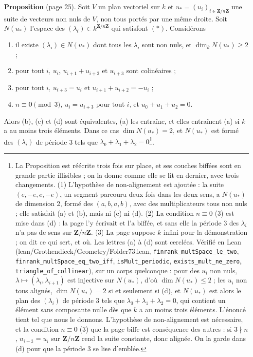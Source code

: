 \documentclass[11pt,a4paper]{article}
\begin{document}
\textbf{Proposition} (page 25). Soit $V$ un plan vectoriel sur $k$ et
$u_* = (u_i)_{i \in \mathbf{Z}/n\mathbf{Z}}$ une suite de vecteurs non nuls de
$V$, non tous portés par une même droite. Soit $N(u_*)$ l'espace des
$(\lambda_i) \in k^{\mathbf{Z}/n\mathbf{Z}}$ qui satisfont $(\ast)$. Considérons
\begin{enumerate}
  \item[(a)] il existe $(\lambda_i) \in N(u_*)$ dont tous les $\lambda_i$ sont
    non nuls, et $\dim_k N(u_*) \geqslant 2$ ;
  \item[(b)] pour tout $i$, $u_i$, $u_{i+1} + u_{i+2}$ et $u_{i+3}$ sont
    colinéaires ;
  \item[(c)] pour tout $i$, $u_{i+3} = u_i$ et $u_{i+1} + u_{i+2} = -u_i$ ;
  \item[(d)] $n \equiv 0 \pmod 3$, $u_i = u_{i+3}$ pour tout $i$, et
    $u_0 + u_1 + u_2 = 0$.
\end{enumerate}
Alors (b), (c) et (d) sont équivalentes, (a) les entraîne, et elles entraînent
(a) si $k$ a au moins trois éléments. Dans ce cas $\dim N(u_*) = 2$, et
$N(u_*)$ est formé des $(\lambda_i)$ de période 3 tels que
$\lambda_0 + \lambda_1 + \lambda_2 = 0$\footnote{La Proposition est réécrite
trois fois sur place, et ses couches biffées sont en grande partie illisibles ;
on la donne comme elle se lit en dernier, avec trois changements. (1)
L'hypothèse de non-alignement est ajoutée : la suite $(e, -e, e, -e)$, un
segment parcouru deux fois dans les deux sens, a $N(u_*)$ de dimension 2,
formé des $(a, b, a, b)$, avec des multiplicateurs tous non nuls ; elle
satisfait (a) et (b), mais ni (c) ni (d). (2) La condition $n \equiv 0$ (3) est
mise dans (d) : la page l'y écrivait et l'a biffée, et sans elle la période 3 des
$\lambda_i$ n'a pas de sens sur $\mathbf{Z}/n\mathbf{Z}$. (3) La page suppose
$k$ infini pour la démonstration ; on dit ce qui sert, et où. Les lettres (a)
à (d) sont cerclées. Vérifié en Lean (lean/Grothendieck/Geometry/Folder73.lean,
\texttt{finrank\_multSpace\_le\_two}, \texttt{finrank\_multSpace\_eq\_two\_iff},
\texttt{isMult\_periodic}, \texttt{exists\_mult\_ne\_zero},
\texttt{triangle\_of\_collinear}), sur un corps quelconque : pour des $u_i$ non
nuls, $\lambda \mapsto (\lambda_i, \lambda_{i+1})$ est injective sur $N(u_*)$,
d'où $\dim N(u_*) \leqslant 2$ ; les $u_i$ non tous alignés, $\dim N(u_*) = 2$
si et seulement si (d), et $N(u_*)$ est alors le plan des $(\lambda_i)$ de
période 3 tels que $\lambda_0 + \lambda_1 + \lambda_2 = 0$, qui contient un
élément sans composante nulle dès que $k$ a au moins trois éléments. L'énoncé
tient tel que nous le donnons. L'hypothèse de non-alignement est nécessaire,
et la condition $n \equiv 0$ (3) que la page biffe est conséquence des autres :
si $3 \nmid n$, $u_{i+3} = u_i$ sur $\mathbf{Z}/n\mathbf{Z}$ rend la suite
constante, donc alignée. On la garde dans (d) pour que la période 3 se lise
d'emblée.}.
\end{document}
